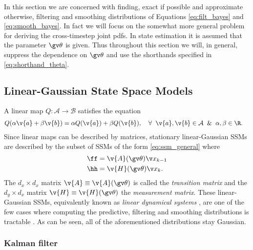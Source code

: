 
In this section we are concerned with finding, exact if possible and approximate
otherwise, filtering and smoothing
distributions of Equations \eqref{eq:filt_bayes} and \eqref{eq:smooth_bayes}.
In fact we will focus on the somewhat more general problem for deriving
the cross-timestep joint pdfs. In state estimation it is assumed that the parameter $\Th$ is given.
Thus throughout this section we will, in general, suppress the dependence on $\Th$ and use the shorthands specified in \eqref{eq:shorthand_theta}. 

\subsection{Linear-Gaussian State Space Models}

A linear map $Q:\mathcal{A}\to\mathcal{B}$ satisfies the equation
\begin{align}
	Q(\alpha\v{a}+\beta\v{b}) &= \alpha Q(\v{a})+\beta Q(\v{b}), \quad \forall\;\; \v{a},\v{b}\in\mathcal{A}\;\;\&\;\;\alpha,\beta \in \R.
\end{align}%
%
Since linear maps can be described by matrices, stationary linear-Gaussian SSMs 
are described by the subset of SSMs of the form \eqref{eq:ssm_general} where  
\begin{align}
	\ff&=\v{A}(\Th)\x_{k-1}\\
	\hh&=\v{H}(\Th)\xk.
\end{align}
The $d_x\times d_x$ matrix $\v{A}\equiv\v{A}(\Th)$ is called the \emph{transition matrix} and
the $d_y\times d_x$ matrix $\v{H}\equiv \v{H}(\Th)$ the \emph{measurement matrix}.
These linear-Gaussian SSMs, equivalently known as \emph{linear dynamical systems} \parencite{Bishop2006},
are one of the few cases where computing the predictive, filtering and
smoothing distributions is tractable \parencite[see, e.g.,][]{Sarkka2006}. As can be seen,
all of the aforementioned distributions stay Gaussian.

\subsubsection{Kalman filter}

